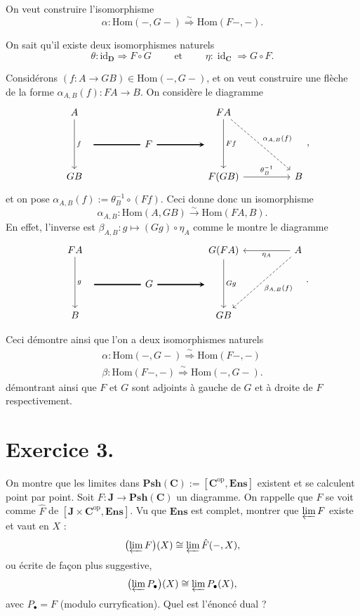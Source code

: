 \documentclass{../../td}
\newcommand\id{\ensuremath{\operatorname{id}}}
\begin{document}
  On veut construire l'isomorphisme \[
    \alpha : \mathrm{Hom}(-, G-) \overset \sim \Rightarrow \mathrm{Hom}(F-,-)
  .\]

  On sait qu'il existe deux isomorphismes naturels \[
  \theta : \mathrm{id}_\mathbf{D} \Rightarrow  F \circ G \quad\quad \text{ et } \quad\quad \eta : \id_\mathbf{C} \Rightarrow G \circ F
  .\]

  Considérons $(f : A \to G B) \in \mathrm{Hom}(-, G -)$, et on veut construire une flèche de la forme $\alpha_{A,B}(f) : FA \to B$.
  On considère le diagramme 
  \[
  \begin{tikzcd}
    A \arrow{dd}{f} &&&& F A \arrow{dd}{Ff} \arrow[dashed]{ddrr}{\alpha_{A,B}(f)} \\
    \quad\quad\quad\arrow[-,very thick]{rr}{} && F \arrow[-stealth,very thick]{rr}{} && \quad\quad\quad \\
    G B &&&& F(GB) \arrow{rr}{\theta^{-1}_B} && B
  \end{tikzcd}
  ,\] 
  et on pose $\alpha_{A,B}(f) := \theta_B^{-1} \circ (F f)$.
  Ceci donne donc un isomorphisme \[
  \alpha_{A,B} : \mathrm{Hom}(A, G B) \overset\sim\longrightarrow \mathrm{Hom}(FA, B)
  .\]
  En effet, l'inverse est $\beta_{A,B} : g \mapsto (G g) \circ \eta_A$ comme le montre le diagramme
  \[
  \begin{tikzcd}
    F A \arrow{dd}{g} &&&& G(F A) \arrow{dd}{Gg} &&  \arrow{ll}{\eta_A} A \arrow[dashed]{ddll}{\beta_{A,B}(f)} \\
    \quad\quad\quad\arrow[-,very thick]{rr}{} && G \arrow[-stealth,very thick]{rr}{} && \quad\quad\quad \\
    B &&&& GB
  \end{tikzcd}
  .\]

  Ceci démontre ainsi que l'on a deux isomorphismes naturels
  \begin{gather*}
    \alpha : \mathrm{Hom}(-, G-) \overset \sim \Rightarrow \mathrm{Hom}(F-,-)\\
    \beta : \mathrm{Hom}(F-, -) \overset \sim \Rightarrow \mathrm{Hom}(-,G-).
  \end{gather*}
  démontrant ainsi que $F$ et $G$ sont adjoints à gauche de $G$ et à droite de $F$ respectivement.
  
  \chapter{Exercice 3.}
  \begin{slshape}
    \color{deepblue}
    On montre que les limites dans $\mathbf{Psh}(\mathbf{C}) := [\mathbf{C}^\mathrm{op}, \mathbf{Ens}]$ existent et se calculent point par point.
    Soit $F : \mathbf{J} \to \mathbf{Psh}(\mathbf{C})$ un diagramme.
    On rappelle que $F$ se voit comme $\hat{F}$ de $[\mathbf{J} \times \mathbf{C}^\mathrm{op}, \mathbf{Ens}]$.
    Vu que $\mathbf{Ens}$ est complet, montrer que $\varprojlim F$ existe et vaut en $X$ : \[
      \big(\!\varprojlim F\big)(X) \cong \varprojlim \hat{F}(-, X)
    ,\] 
    ou écrite de façon plus suggestive, \[
      \big(\!\varprojlim P_\bullet\big)(X) \cong \varprojlim P_\bullet(X)
    ,\] avec $P_\bullet = F$ (modulo curryfication).
    Quel est l'énoncé dual ?
  \end{slshape}
\end{document}
